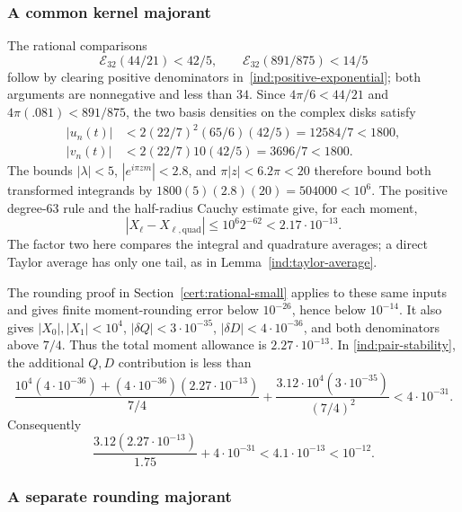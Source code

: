 \subsubsection{A common kernel majorant}\label{ind:small-kernel}

The rational comparisons
\begin{equation}\label{ind:small-exponentials}
 \mathcal E_{32}(44/21)<42/5,\qquad
 \mathcal E_{32}(891/875)<14/5
\end{equation}
follow by clearing positive denominators in~\eqref{ind:positive-exponential};
both arguments are nonnegative and less than $34$.  Since
$4\pi/6<44/21$ and $4\pi(.081)<891/875$, the two basis densities on the
complex disks satisfy
\[
\begin{aligned}
 |u_n(t)|&<2(22/7)^2(65/6)(42/5)=12584/7<1800,\\
 |v_n(t)|&<2(22/7)10(42/5)=3696/7<1800.
\end{aligned}
\]
The bounds $|\lambda|<5$, $|e^{i\pi zm}|<2.8$, and
$\pi|z|<6.2\pi<20$ therefore bound both transformed integrands by
$1800(5)(2.8)(20)=504000<10^6$.  The positive degree-63 rule and the
half-radius Cauchy estimate give, for each moment,
\begin{equation}\label{ind:small-kernel-quadrature}
 |X_\ell-X_{\ell,\mathrm{quad}}|\le10^6 2^{-62}<2.17\cdot10^{-13}.
\end{equation}
The factor two here compares the integral and quadrature averages; a direct
Taylor average has only one tail, as in Lemma~\ref{ind:taylor-average}.

The rounding proof in Section~\ref{cert:rational-small} applies to these
same inputs and gives
finite moment-rounding error below $10^{-26}$, hence below $10^{-14}$.
It also gives $|X_0|,|X_1|<10^4$, $|\delta Q|<3\cdot10^{-35}$,
$|\delta D|<4\cdot10^{-36}$, and both denominators above $7/4$.
Thus the total moment allowance is $2.27\cdot10^{-13}$.  In
\eqref{ind:pair-stability}, the additional $Q,D$ contribution is less than
\[
 \frac{10^4(4\cdot10^{-36})+(4\cdot10^{-36})(2.27\cdot10^{-13})}{7/4}
 +\frac{3.12\cdot10^4(3\cdot10^{-35})}{(7/4)^2}<4\cdot10^{-31}.
\]
Consequently
\begin{equation}\label{ind:small-kernel-entry}
 \frac{3.12(2.27\cdot10^{-13})}{1.75}+4\cdot10^{-31}
 <4.1\cdot10^{-13}<10^{-12}.
\end{equation}

\subsubsection{A separate rounding majorant}\label{ind:small-rounding}

